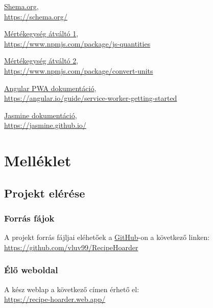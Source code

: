 \documentclass[12pt]{report}
\theoremstyle{definition}
\begin{document}
\begin{thebibliography}{9}
	\href{https://schema.org/}{Shema.org}, \\
	\url{https://schema.org/}

	\href{https://www.npmjs.com/package/js-quantities}{Mértékegység átváltó 1}, \\
	\url{https://www.npmjs.com/package/js-quantities}

	\href{https://www.npmjs.com/package/convert-units}{Mértékegység átváltó 2}, \\
	\url{https://www.npmjs.com/package/convert-units}

	\href{https://angular.io/guide/service-worker-getting-started}{Angular PWA dokumentáció}, \\
	\url{https://angular.io/guide/service-worker-getting-started}

	\href{https://jasmine.github.io/}{Jasmine dokumentáció}, \\
	\url{https://jasmine.github.io/}

\end{thebibliography}

\chapter{Melléklet} 

\section{Projekt elérése}

\subsection{Forrás fájok}
A projekt forrás fájljai eléhetőek a \href{https://github.com/vluv99/RecipeHoarder}{GitHub}-on a következő linken:\\
\url{https://github.com/vluv99/RecipeHoarder}

\subsection{Élő weboldal}
A kész weblap a következő címen érhető el:\\
\url{https://recipe-hoarder.web.app/}

\printglossary[title=Szótár]
\end{document}
